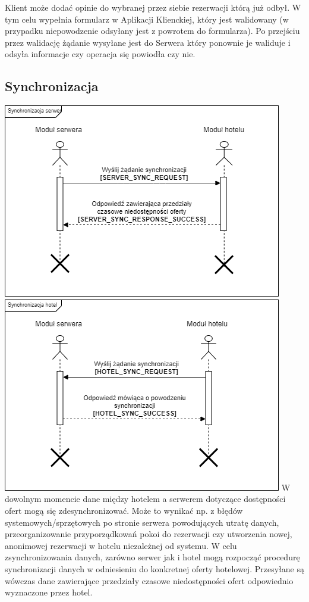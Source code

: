 \documentclass{article}
\begin{document}
Klient może dodać opinie do wybranej przez siebie rezerwacji którą już odbył. W tym celu wypełnia formularz w Aplikacji Klienckiej, który jest walidowany (w przypadku niepowodzenie odsyłany jest z powrotem do formularza). Po przejściu przez walidację żądanie wysyłane jest do Serwera który ponownie je waliduje i odsyła informacje czy operacja się powiodła czy nie.
\subsection{Synchronizacja}
\includegraphics[width=\linewidth]{Sekwencje/Synchronization_Server.png.png}
\includegraphics[width=\linewidth]{Sekwencje/Synchronization_Hotel.png}
W dowolnym momencie dane między hotelem a serwerem dotyczące dostępności ofert mogą się zdesynchronizować. Może to wynikać np. z błędów systemowych/sprzętowych po stronie serwera powodujących utratę danych, przeorganizowanie przyporządkowań pokoi do rezerwacji czy utworzenia nowej, anonimowej rezerwacji w hotelu niezależnej od systemu. W celu zsynchronizowania danych, zarówno serwer jak i hotel mogą rozpocząć procedurę synchronizacji danych w odniesieniu do konkretnej oferty hotelowej. Przesyłane są wówczas dane zawierające przedziały czasowe niedostępności ofert odpowiednio wyznaczone przez hotel.
\end{document}
